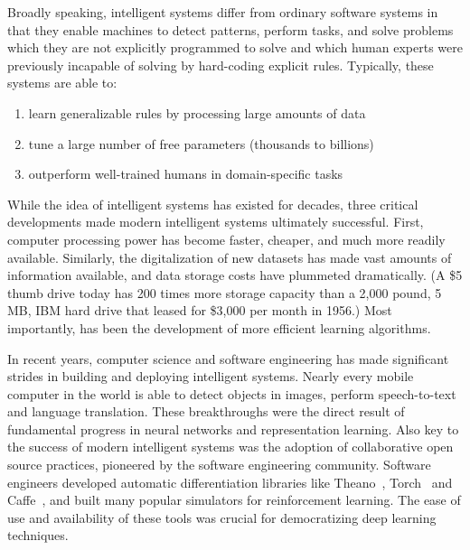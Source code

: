 Broadly speaking, intelligent systems differ from ordinary software systems in that they enable machines to detect patterns, perform tasks, and solve problems which they are not explicitly programmed to solve and which human experts were previously incapable of solving by hard-coding explicit rules. Typically, these systems are able to:\\
%
\begin{enumerate}
    \item learn generalizable rules by processing large amounts of data
    \item tune a large number of free parameters (thousands to billions)
    \item outperform well-trained humans in domain-specific tasks
\end{enumerate}
%
While the idea of intelligent systems has existed for decades, three critical developments made modern intelligent systems ultimately successful. First, computer processing power has become faster, cheaper, and much more readily available. Similarly, the digitalization of new datasets has made vast amounts of information available, and data storage costs have plummeted dramatically. (A \$5 thumb drive today has 200 times more storage capacity than a 2,000 pound, 5 MB, IBM hard drive that leased for \$3,000 per month in 1956.) Most importantly, has been the development of more efficient learning algorithms.

In recent years, computer science and software engineering has made significant strides in building and deploying intelligent systems. Nearly every mobile computer in the world is able to detect objects in images, perform speech-to-text and language translation. These breakthroughs were the direct result of fundamental progress in neural networks and representation learning. Also key to the success of modern intelligent systems was the adoption of collaborative open source practices, pioneered by the software engineering community. Software engineers developed automatic differentiation libraries like Theano~\citep{bergstra2010theano}, Torch~\citep{collobert2002torch} and Caffe~\citep{jia2014caffe}, and built many popular simulators for reinforcement learning. The ease of use and availability of these tools was crucial for democratizing deep learning techniques.

